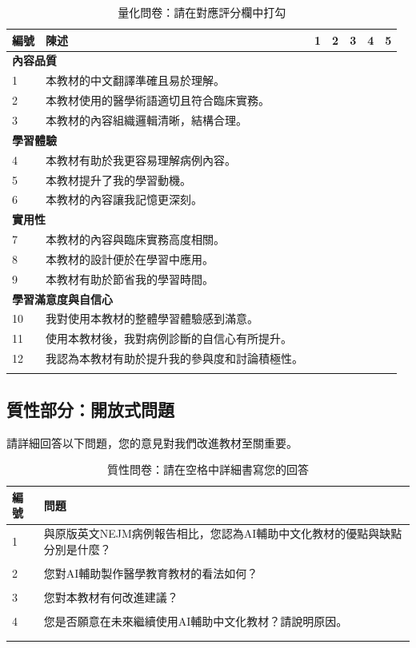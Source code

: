 \documentclass[12pt]{article}
\begin{document}
\begin{longtable}{p{1cm} p{7cm} p{1.5cm} p{1.5cm} p{1.5cm} p{1.5cm} p{1.5cm}}
\toprule
\textbf{編號} & \textbf{陳述} & \textbf{1} & \textbf{2} & \textbf{3} & \textbf{4} & \textbf{5} \\
\midrule
\multicolumn{7}{l}{\textbf{內容品質}} \\
1 & 本教材的中文翻譯準確且易於理解。 & & & & & \\
2 & 本教材使用的醫學術語適切且符合臨床實務。 & & & & & \\
3 & 本教材的內容組織邏輯清晰，結構合理。 & & & & & \\
\multicolumn{7}{l}{\textbf{學習體驗}} \\
4 & 本教材有助於我更容易理解病例內容。 & & & & & \\
5 & 本教材提升了我的學習動機。 & & & & & \\
6 & 本教材的內容讓我記憶更深刻。 & & & & & \\
\multicolumn{7}{l}{\textbf{實用性}} \\
7 & 本教材的內容與臨床實務高度相關。 & & & & & \\
8 & 本教材的設計便於在學習中應用。 & & & & & \\
9 & 本教材有助於節省我的學習時間。 & & & & & \\
\multicolumn{7}{l}{\textbf{學習滿意度與自信心}} \\
10 & 我對使用本教材的整體學習體驗感到滿意。 & & & & & \\
11 & 使用本教材後，我對病例診斷的自信心有所提升。 & & & & & \\
12 & 我認為本教材有助於提升我的參與度和討論積極性。 & & & & & \\
\bottomrule
\caption{量化問卷：請在對應評分欄中打勾}
\end{longtable}

\subsection*{質性部分：開放式問題}
請詳細回答以下問題，您的意見對我們改進教材至關重要。

\begin{longtable}{p{1cm} p{14cm}}
\toprule
\textbf{編號} & \textbf{問題} \\
\midrule
1 & 與原版英文NEJM病例報告相比，您認為AI輔助中文化教材的優點與缺點分別是什麼？ \\
 & \vspace{3cm} \\
2 & 您對AI輔助製作醫學教育教材的看法如何？ \\
 & \vspace{3cm} \\
3 & 您對本教材有何改進建議？ \\
 & \vspace{3cm} \\
4 & 您是否願意在未來繼續使用AI輔助中文化教材？請說明原因。 \\
 & \vspace{3cm} \\
\bottomrule
\caption{質性問卷：請在空格中詳細書寫您的回答}
\end{longtable}
\end{document}
